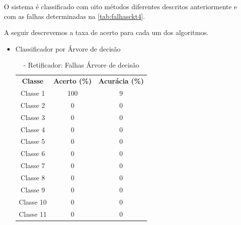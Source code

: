 O sistema é classificado com oito métodos diferentes descritos anteriormente e com as falhas determinadas na \ref{tab:falhasckt4}. 

A seguir descrevemos a taxa de acerto para cada um dos algoritmos. 


\begin{itemize}
\newpage
 \item Classificador por Árvore de decisão
 
\begin{table}[ht]
\centering
\begin{tabular}{ccc}
\textbf{Classe} & \textbf{Acerto (\%)} & \textbf{Acurácia (\%)} \\
Classe 1        & 100                  & 9                    \\
Classe 2         & 0                  & 0                    \\
Classe 3        & 0                  & 0                     \\
Classe 4       & 0                  & 0                     \\
Classe 5        & 0                  & 0                    \\
Classe 6        & 0                  & 0                     \\
Classe 7         & 0                  & 0                     \\
Classe 8         & 0                  & 0                      \\
Classe 9         & 0                  & 0                     \\
Classe 10        & 0                  & 0                    \\
Classe 11       & 0                  & 0                                      
\end{tabular}
\caption{\label{tab:Retnarvore}- Retificador: Falhas Árvore de decisão}
\end{table}


\end{itemize}
